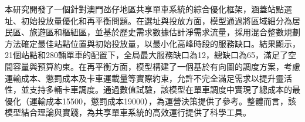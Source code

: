 本研究開發了一個針對澳門氹仔地區共享單車系統的綜合優化框架，涵蓋站點選址、初始投放量優化和再平衡問題。在選址與投放方面，模型通過將區域細分為居民區、旅遊區和樞紐區，並基於歷史需求數據估計淨需求流量，採用混合整數規劃方法確定最佳站點位置與初始投放量，以最小化高峰時段的服務缺口。結果顯示，21個站點和280輛單車的配置下，全局最大服務缺口為12，總缺口為65，滿足了空間容量與預算約束。在再平衡方面，模型構建了一個基於有向圖的調度方案，考慮運輸成本、懲罰成本及卡車運載量等實際約束，允許不完全滿足需求以提升靈活性，並支持多輛卡車調度。通過數值試驗，該模型在單車調度中實現了總成本的最優化（運輸成本15500，懲罰成本19000），為運營決策提供了參考。整體而言，該模型結合理論與實踐，為共享單車系統的高效運行提供了科學工具。